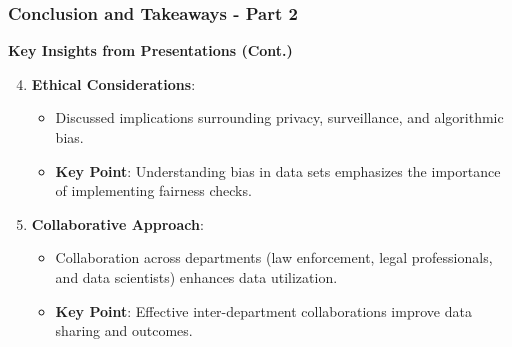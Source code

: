 \documentclass[aspectratio=169]{beamer}
\begin{document}
\begin{frame}[fragile]
    \frametitle{Conclusion and Takeaways - Part 2}

    \textbf{Key Insights from Presentations (Cont.)}
    
    \begin{enumerate}
        \setcounter{enumi}{3} %
        \item \textbf{Ethical Considerations}:
            \begin{itemize}
                \item Discussed implications surrounding privacy, surveillance, and algorithmic bias.
                \item \textbf{Key Point}: Understanding bias in data sets emphasizes the importance of implementing fairness checks.
            \end{itemize}
        
        \item \textbf{Collaborative Approach}:
            \begin{itemize}
                \item Collaboration across departments (law enforcement, legal professionals, and data scientists) enhances data utilization.
                \item \textbf{Key Point}: Effective inter-department collaborations improve data sharing and outcomes.
            \end{itemize}
    \end{enumerate}
    
\end{frame}
\end{document}
